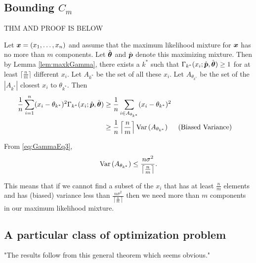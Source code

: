 	\subsection{Bounding \texorpdfstring{$C_m$}{Cm}}
	\label{sec:bounding Cm}
		\begin{theorem}
			THM AND PROOF IS BELOW
			\label{thm:general n constraints result}
		\end{theorem}
		Let ${\bm{{x}}} = (x_1,\dots,x_n)$ and assume that the maximum likelihood mixture for ${\bm{{x}}}$ has no more than $m$ components. Let $\hat{{\bm{{\theta}}}}$ and $\hat{{\bm{{p}}}}$ denote this maximizing mixture. %
		Then by Lemma \ref{lem:maxkGamma}, there exists a $k^*$ such that $\Gamma_{k^*}(x_i;\hat{{\bm{{p}}}},\hat{{\bm{{\theta}}}}) \geq 1$ for at least $\lceil \frac{n}{m} \rceil$ different $x_i$. Let $A_{k^*}$ be the set of all these $x_i$. 
		Let $A_{\theta_{k^*}}$ be the set of the $|A_{k^*}|$ closest $x_i$ to $\theta_{k^*}$. Then
		\begin{align}
			\frac{1}{n} \sum_{i=1}^n (x_i - \theta_{k^*})^2 \Gamma_{k^*}(x_i; \hat{{\bm{{p}}}},\hat{{\bm{{\theta}}}}) &\geq \frac{1}{n} \sum_{i \in A_{\theta_{k^*}}} (x_i - \theta_{k^*})^2 \\
			&\geq \frac{1}{n} \left \lceil \frac{n}{m} \right \rceil \mathrm{Var}\left(A_{\theta_{k^*}}\right) &&\text{(Biased Variance)}
		\end{align}

		From \eqref{eq:GammaEq3},
		\begin{equation}
			\mathrm{Var}\left(A_{\theta_{k^*}}\right) \leq \frac{n \sigma^2}{\left\lceil \frac{n}{m} \right\rceil}.
		\end{equation}

		This means that if we cannot find a subset of the $x_i$ that has at least $\frac{n}{m}$ elements and has (biased) variance less than $\frac{n\sigma^2}{\left\lceil \frac{n}{m} \right\rceil}$ then we need more than $m$ components in our maximum likelihood mixture.


	\subsection{A particular class of optimization problem}
		"The results follow from this general theorem which seems obvious."

